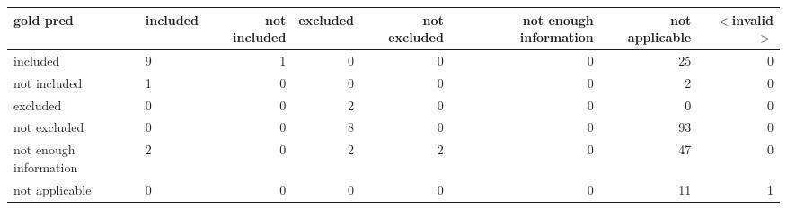 \begin{tabular}{llrrrrrr}
\toprule
gold  pred & included & not included & excluded & not excluded & not enough information & not applicable & $<$invalid$>$ \\
\midrule
included & 9 & 1 & 0 & 0 & 0 & 25 & 0 \\
not included & 1 & 0 & 0 & 0 & 0 & 2 & 0 \\
excluded & 0 & 0 & 2 & 0 & 0 & 0 & 0 \\
not excluded & 0 & 0 & 8 & 0 & 0 & 93 & 0 \\
not enough information & 2 & 0 & 2 & 2 & 0 & 47 & 0 \\
not applicable & 0 & 0 & 0 & 0 & 0 & 11 & 1 \\
\bottomrule
\end{tabular}
